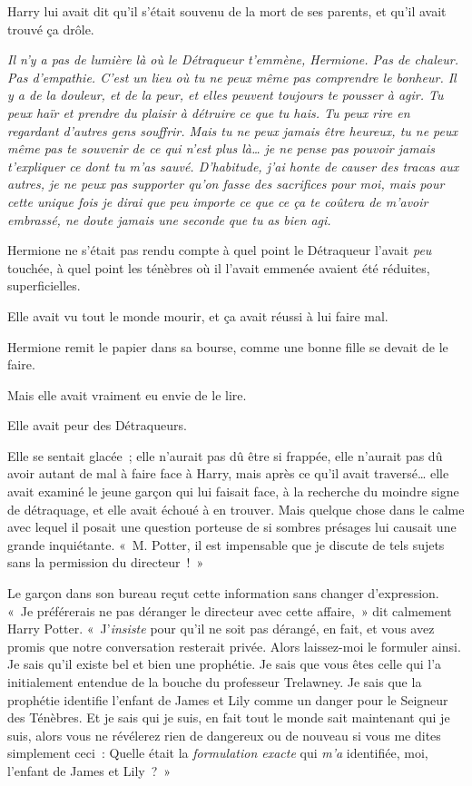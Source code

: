 Harry lui avait dit qu'il s'était souvenu de la mort de ses parents, et qu'il avait trouvé ça drôle.

\emph{Il n'y a pas de lumière là où le Détraqueur t'emmène, Hermione.
Pas de chaleur.
Pas d'empathie.
C'est un lieu où tu ne peux même pas comprendre le bonheur.
Il y a de la douleur, et de la peur, et elles peuvent toujours te pousser à agir.
Tu peux haïr et prendre du plaisir à détruire ce que tu hais.
Tu peux rire en regardant d'autres gens souffrir.
Mais tu ne peux jamais être heureux, tu ne peux même pas te souvenir de ce qui n'est plus là… je ne pense pas pouvoir jamais t'expliquer ce dont tu m'as sauvé.
D'habitude, j'ai honte de causer des tracas aux autres, je ne peux pas supporter qu'on fasse des sacrifices pour moi, mais pour cette unique fois je dirai que peu importe ce que ce ça te coûtera de m'avoir embrassé, ne doute jamais une seconde que tu as bien agi.}

Hermione ne s'était pas rendu compte à quel point le Détraqueur l'avait \emph{peu} touchée, à quel point les ténèbres où il l'avait emmenée avaient été réduites, superficielles.

Elle avait vu tout le monde mourir, et ça avait réussi à lui faire mal.

Hermione remit le papier dans sa bourse, comme une bonne fille se devait de le faire.

Mais elle avait vraiment eu envie de le lire.

Elle avait peur des Détraqueurs.


Elle se sentait glacée~; elle n'aurait pas dû être si frappée, elle n'aurait pas dû avoir autant de mal à faire face à Harry, mais après ce qu'il avait traversé… elle avait examiné le jeune garçon qui lui faisait face, à la recherche du moindre signe de détraquage, et elle avait échoué à en trouver.
Mais quelque chose dans le calme avec lequel il posait une question porteuse de si sombres présages lui causait une grande inquiétante.
«~M. Potter, il est impensable que je discute de tels sujets sans la permission du directeur~!~»

Le garçon dans son bureau reçut cette information sans changer d'expression.
«~Je préférerais ne pas déranger le directeur avec cette affaire,~» dit calmement Harry Potter.
«~J'\emph{insiste} pour qu'il ne soit pas dérangé, en fait, et vous avez promis que notre conversation resterait privée.
Alors laissez-moi le formuler ainsi.
Je sais qu'il existe bel et bien une prophétie.
Je sais que vous êtes celle qui l'a initialement entendue de la bouche du professeur Trelawney.
Je sais que la prophétie identifie l'enfant de James et Lily comme un danger pour le Seigneur des Ténèbres.
Et je sais qui je suis, en fait tout le monde sait maintenant qui je suis, alors vous ne révélerez rien de dangereux ou de nouveau si vous me dites simplement ceci~: Quelle était la \emph{formulation exacte} qui \emph{m'a} identifiée, moi, l'enfant de James et Lily~?~»

